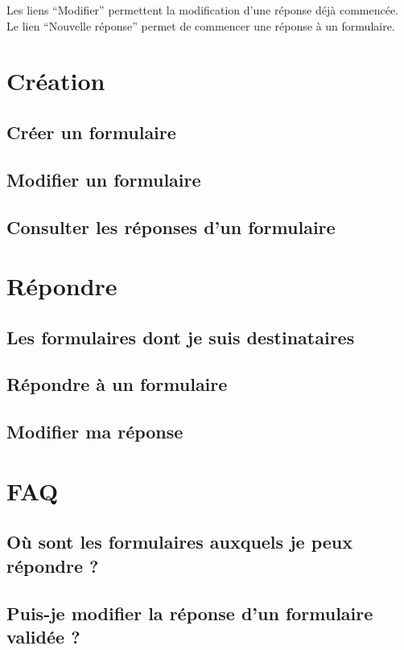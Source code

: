 \documentclass[a4paper,11pt,final]{report}
\begin{document}
Les liens ``Modifier'' permettent la modification d'une réponse déjà commencée. Le lien ``Nouvelle réponse'' permet de commencer une réponse à un formulaire.

\noindent\begin{minipage}{\linewidth}%
\label{zoneFormRecu}
\end{minipage}

\chapter{Création}
\section{Créer un formulaire}
\section{Modifier un formulaire}
\section{Consulter les réponses d'un formulaire}

\chapter{Répondre}
\section{Les formulaires dont je suis destinataires}
\section{Répondre à un formulaire}
\section{Modifier ma réponse}


\chapter{FAQ}
\section{Où sont les formulaires auxquels je peux répondre ?}
\section{Puis-je modifier la réponse d'un formulaire validée ?}
\end{document}
